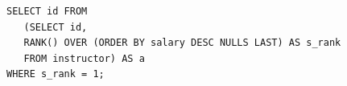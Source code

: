 \documentclass[aspectratio=169, 14pt]{beamer}
\begin{document}
\begin{frame}[fragile]

    \begin{verbatim}
SELECT id FROM 
   (SELECT id, 
   RANK() OVER (ORDER BY salary DESC NULLS LAST) AS s_rank
   FROM instructor) AS a
WHERE s_rank = 1;
    \end{verbatim}
    

\end{frame}
\end{document}
